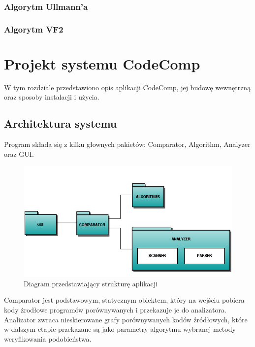 \documentclass[a4paper,12pt]{article}
\begin{document}
\newpage

\subsubsection{Algorytm Ullmann'a}


\newpage

\subsubsection{Algorytm VF2}

\cite{vf2}

\newpage

\section{Projekt systemu CodeComp}

W tym rozdziale przedstawiono opis aplikacji CodeComp, jej budowę wewnętrzną oraz sposoby instalacji i użycia.

\subsection{Architektura systemu}

Program składa się z kilku głownych pakietów: Comparator, Algorithm, Analyzer oraz GUI.

\begin{figure}[!h]
\centering
\includegraphics[scale=0.65]{gfx/packagediagram.png}
\caption{Diagram przedstawiający strukturę aplikacji}
\end{figure}

Comparator jest podstawowym, statycznym obiektem, który na wejściu pobiera kody źrodłowe programów porównywanych i przekazuje je do analizatora. Analizator zwraca nieskierowane grafy porównywanych kodów źródłowych, które w dalszym etapie przekazane są jako parametry algorytmu wybranej metody weryfikowania podobieństwa. 
\end{document}
